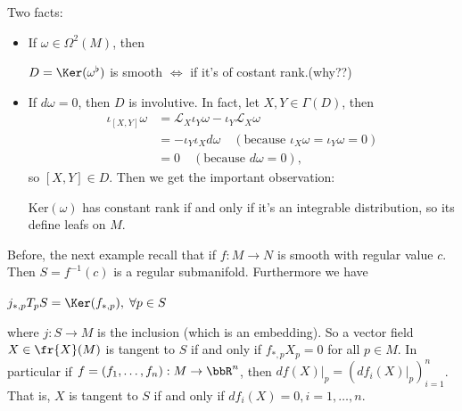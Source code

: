 Two facts:
\begin{itemize}
    \item If $\omega\in\Omega^2(M)$, then 
    \begin{center}
        $D=\Ker(\omega^\flat)$ is smooth $\iff$ if it's of costant rank.\;\;(why??)
    \end{center}
    \item If $d\omega=0$, then $D$ is involutive. In fact, let $X,Y\in\Gamma(D)$, then 
    \begin{equation}
        \begin{split}
            \iota_{[X,Y]}\omega&=\mathcal{L}_X\iota_Y\omega-\iota_Y\mathcal{L}_X\omega\\
            &=-\iota_Y\iota_Xd\omega\quad(\text{because }\iota_X\omega=\iota_Y\omega=0)\\
            &=0\quad(\text{because }d\omega=0),
        \end{split}
    \end{equation}
    so $[X,Y]\in D$. Then we get the important observation:
    \begin{dang}
        \begin{remark}
        $\text{Ker}(\omega)$ has constant rank if and only if it's an integrable distribution, so its define leafs 
        on $M$.
    \end{remark}
    \end{dang}
\end{itemize}

Before, the next example recall that if $f: M\to N$ is smooth with regular value $c$. Then  
$S=f^{-1}(c)$ is a regular submanifold. Furthermore we have 
\begin{center}
    $j_{*,p}T_pS=\Ker(f_{*,p}),\;\forall p\in S$
\end{center}
where $j:S\to M$ is the inclusion (which is an embedding). So a vector field $X\in\fr{X}(M)$ is tangent to $S$ if and only if 
$f_{*,p}X_p=0$ for all $p\in M$. In particular if $f=(f_1,\dots,f_n):M\to\bbR^n$, then 
$df(X)|_p=(df_i(X)|_p)_{i=1}^n$. That is, $X$ is tangent to $S$ if and only if $df_i(X)=0,i=1,\dots,n$. 

